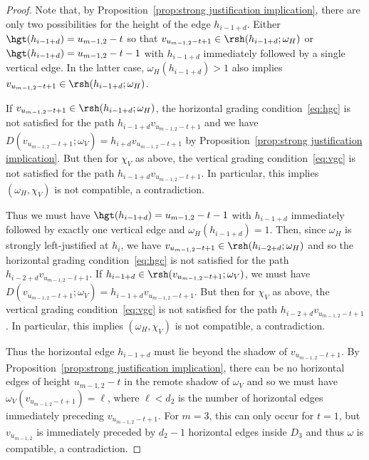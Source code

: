 \begin{proof}
 Note that, by Proposition~\ref{prop:strong justification implication}, there are only two possibilities for the height of the edge $h_{i-1+d}$.
 Either $\hgt(h_{i-1+d})=u_{m-1,2}-t$ so that $v_{u_{m-1,2}-t+1}\in\rsh(h_{i-1+d};\omega_H)$ or $\hgt(h_{i-1+d})=u_{m-1,2}-t-1$ with $h_{i-1+d}$ immediately followed by a single vertical edge.
 In the latter case, $\omega_H(h_{i-1+d})>1$ also implies $v_{u_{m-1,2}-t+1}\in\rsh(h_{i-1+d};\omega_H)$.

 If $v_{u_{m-1,2}-t+1}\in\rsh(h_{i-1+d};\omega_H)$, the horizontal grading condition~\eqref{eq:hgc} is not satisfied for the path $h_{i-1+d}v_{u_{m-1,2}-t+1}$ and we have $D(v_{u_{m-1,2}-t+1};\omega_V)=h_{i+d}v_{u_{m-1,2}-t+1}$ by Proposition~\ref{prop:strong justification implication}.
 But then for $\chi_V$ as above, the vertical grading condition~\eqref{eq:vgc} is not satisfied for the path $h_{i-1+d}v_{u_{m-1,2}-t+1}$.
 In particular, this implies $(\omega_H,\chi_V)$ is not compatible, a contradiction.

 Thus we must have $\hgt(h_{i-1+d})=u_{m-1,2}-t-1$ with $h_{i-1+d}$ immediately followed by exactly one vertical edge and $\omega_H(h_{i-1+d})=1$.
 Then, since $\omega_H$ is strongly left-justified at $h_i$, we have $v_{u_{m-1,2}-t+1}\in\rsh(h_{i-2+d};\omega_H)$ and so the horizontal grading condition~\eqref{eq:hgc} is not satisfied for the path $h_{i-2+d}v_{u_{m-1,2}-t+1}$.
 If $h_{i-1+d}\in\rsh(v_{u_{m-1,2}-t+1};\omega_V)$, we must have $D(v_{u_{m-1,2}-t+1};\omega_V)=h_{i-1+d}v_{u_{m-1,2}-t+1}$.
 But then for $\chi_V$ as above, the vertical grading condition~\eqref{eq:vgc} is not satisfied for the path $h_{i-2+d}v_{u_{m-1,2}-t+1}$.
 In particular, this implies $(\omega_H,\chi_V)$ is not compatible, a contradiction.

 Thus the horizontal edge $h_{i-1+d}$ must lie beyond the shadow of $v_{u_{m-1,2}-t+1}$.
 By Proposition~\ref{prop:strong justification implication}, there can be no horizontal edges of height $u_{m-1,2}-t$ in the remote shadow of $\omega_V$ and so we must have $\omega_V(v_{u_{m-1,2}-t+1})=\ell$, where $\ell<d_2$ is the number of horizontal edges immediately preceding $v_{u_{m-1,2}-t+1}$. 
 For $m=3$, this can only occur for $t=1$, but $v_{u_{m-1,2}}$ is immediately preceded by $d_2-1$ horizontal edges inside $D_3$ and thus $\omega$ is compatible, a contradiction.


\end{proof}
